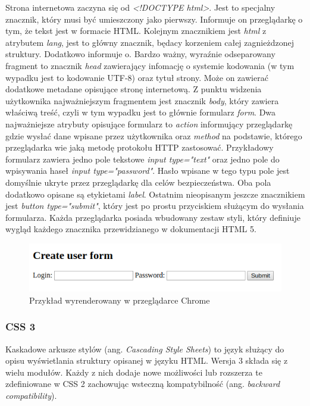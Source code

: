 \documentclass[polish, twoside, 12pt]{mwart}
\begin{document}


Strona internetowa zaczyna się od \emph{<!DOCTYPE html>}. Jest to specjalny znacznik, który musi być umieszczony jako pierwszy. Informuje on przeglądarkę o tym, że tekst jest w formacie HTML. Kolejnym znacznikiem jest \emph{html} z atrybutem \emph{lang}, jest to główny znacznik, będacy korzeniem całej zagnieżdzonej struktury. Dodatkowo informuje o. Bardzo ważny, wyraźnie odseparowany fragment to znacznik \emph{head} zawierający infomację o systemie kodowania (w tym wypadku jest to  kodowanie UTF-8) oraz tytuł strony. Może on zawierać dodatkowe metadane opisujące stronę internetową. Z punktu widzenia użytkownika najważniejszym fragmentem jest znacznik \emph{body}, który zawiera właściwą treść, czyli w tym wypadku jest to głównie formularz \emph{form}. Dwa najważniejsze atrybuty opisujące formularz to \emph{action} informujący przeglądarkę gdzie wysłać dane wpisane przez użytkownika oraz \emph{method} na podstawie, którego przeglądarka wie jaką metodę protokołu HTTP zastosować. Przykładowy formularz zawiera jedno pole tekstowe \emph{input type="text"} oraz jedno pole do wpisywania haseł \emph{input type="password"}. Hasło wpisane w tego typu pole jest domyślnie ukryte przez przeglądarkę dla celów bezpieczeństwa. Oba pola dodatkowo opisane są etykietami \emph{label}. Ostatnim nieopisanym jeszcze znacznikiem jest \emph{button type="submit"}, który jest po prostu przyciskiem służącym do wysłania formularza. Każda przeglądarka posiada wbudowany zestaw styli, który definiuje wygląd każdego znacznika przewidzianego w dokumentacji HTML 5.

\begin{figure}[ht]
  \includegraphics[width=\textwidth]{html-chrome.png}
	\caption{Przykład wyrenderowany w przeglądarce Chrome}
\end{figure}

\subsubsection{CSS 3}

Kaskadowe arkusze stylów (ang. \emph{Cascading Style Sheets}) to język służący do opisu wyświetlania struktury opisanej w języku HTML. Wersja 3 składa się z wielu modułów. Każdy z nich dodaje nowe możliwości lub rozszerza te zdefiniowane w CSS 2 zachowując wsteczną kompatybilność (ang. \emph{backward compatibility}).
\end{document}
